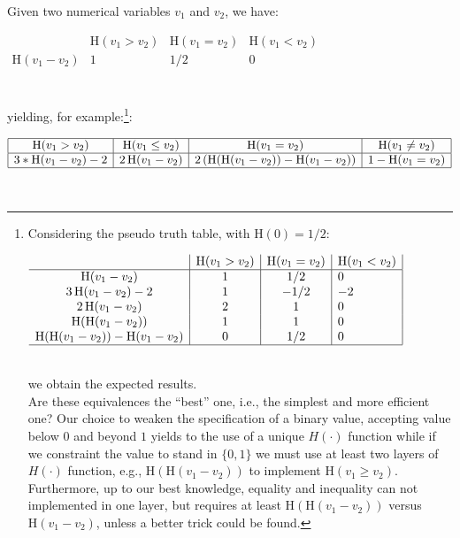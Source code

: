 \documentclass[a4]{article} \usepackage[left=2cm,right=3cm,top=1cm,bottom=2cm]{geometry}
\newcommand{\eqline}[1]{~\vspace{0.1cm}\\\centerline{$#1$}\vspace{0.1cm}\\}
\begin{document}
Given two numerical variables $v_1$ and $v_2$, we have:
\eqline{\begin{array}{c|c|c|l|}
                                                             &\mbox{H}(v_1 > v_2) &\mbox{H}(v_1 = v_2) & \mbox{H}(v_1 < v_2) \\\hline
    \mbox{H}(v_1 - v_2)                                      & 1                  &   1/2           & 0 \\
\end{array}}
yielding, for example:\footnote{
Considering the pseudo truth table, with $\mbox{H}(0) = 1/2$:
\eqline{\begin{array}{c|c|c|l|}
                                                             &\mbox{H}(v_1 > v_2) &\mbox{H}(v_1 = v_2) & \mbox{H}(v_1 < v_2) \\\hline
    \mbox{H}(v_1 - v_2)                                      & 1    &   1/2  & 0 \\
    3 \, \mbox{H}(v_1 - v_2)  - 2                        & 1   &   -1/2   & -2 \\
   2 \, \mbox{H}(v_1 - v_2)                          & 2    &  1   &  0 \\
    \mbox{H}(\mbox{H}(v_1 - v_2))                                     & 1                 &   1                  & 0 \\
    \mbox{H}(\mbox{H}(v_1 - v_2))   -   \mbox{H}(v_1 - v_2)     & 0                 &   1/2              & 0 \\
\hline \end{array}}  we obtain the expected results. \\ Are these equivalences the ``best'' one, i.e., the simplest and more efficient one? Our choice to weaken the specification of a binary value, accepting value below $0$ and beyond $1$ yields to the use of a unique $H(\cdot)$ function while if we constraint the value to stand in $\{0, 1\}$ we must use at least two layers of $H(\cdot)$ function, e.g., $\mbox{H}(\mbox{H}(v_1 - v_2))$ to implement $\mbox{H}(v_1 \ge v_2)$. Furthermore, up to our best knowledge, equality and inequality can not implemented in one layer, but requires at least $\mbox{H}(\mbox{H}(v_1 - v_2))$ versus $\mbox{H}(v_1 - v_2)$, unless a better trick could be found.}:
\eqline{\begin{array}{|c|c|c|c|}\hline
    \mbox{H}(v_1 > v_2)                            & \mbox{H}(v_1 \le v_2)                              & \mbox{H}(v_1 = v_2)                                                    & \mbox{H}(v_1 \ne v_2)         \\  \hline
    3 * \mbox{H}(v_1 - v_2) - 2               & 2 \, \mbox{H}(v_1 - v_2)  & 2 \, (\mbox{H}(\mbox{H}(v_1 - v_2)) -  \mbox{H}(v_1 - v_2)) & 1 - \mbox{H}(v_1 = v_2)    \\
\hline\end{array}}
\end{document}
